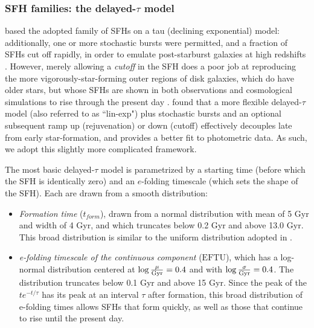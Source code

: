 \subsubsection{SFH families: the delayed-$\tau$ model}
\label{chap1:sec:SPS_params}

 based the adopted family of SFHs on a tau (declining exponential) model: additionally, one or more stochastic bursts were permitted, and a fraction of SFHs cut off rapidly, in order to emulate post-starburst galaxies at high redshifts \citep{kriek_06, kriek_09}. However, merely allowing a \emph{cutoff} in the SFH does a poor job at reproducing the more vigorously-star-forming outer regions of disk galaxies, which do have older stars, but whose SFHs are shown in both observations and cosmological simulations to rise through the present day \citep{pacifici_12_SFHs,pacifici_13_SFHs}. \citet{simha_14_SFHs} found that a more flexible delayed-$\tau$ model (also referred to as ``lin-exp") plus stochastic bursts and an optional subsequent ramp up (rejuvenation) or down (cutoff) effectively decouples late from early star-formation, and provides a better fit to photometric data. As such, we adopt this slightly more complicated framework.

The most basic delayed-$\tau$ model is parametrized by a starting time (before which the SFH is identically zero) and an $e$-folding timescale (which sets the shape of the SFH). Each are drawn from a smooth distribution:

\begin{itemize}
\itemsep0em
    \item \emph{Formation time} ($t_{form}$), drawn from a normal distribution with mean of 5 Gyr and width of 4 Gyr, and which truncates below 0.2 Gyr and above 13.0 Gyr. This broad distribution is similar to the uniform distribution adopted in .
    \item \emph{e-folding timescale of the continuous component} ($\textrm{EFTU}$), which has a log-normal distribution centered at $\log \frac{\mu}{\rm Gyr} = 0.4$ and with $\log \frac{\sigma}{\rm Gyr} = 0.4$. The distribution truncates below 0.1 Gyr and above 15 Gyr. Since the peak of the $t e^{-t/\tau}$ has its peak at an interval $\tau$ after formation, this broad distribution of e-folding times allows SFHs that form quickly, as well as those that continue to rise until the present day.
\end{itemize}

